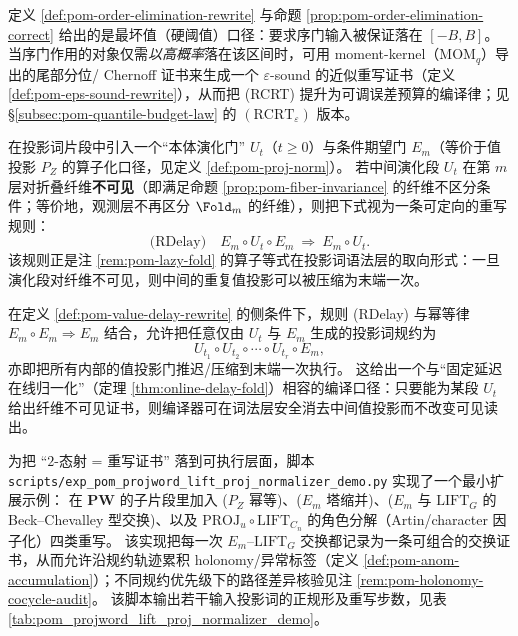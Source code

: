 \begin{remark}\label{rem:pom-rcrt-epsilon-pointer}
定义 \ref{def:pom-order-elimination-rewrite} 与命题 \ref{prop:pom-order-elimination-correct} 给出的是最坏值（硬阈值）口径：要求序门输入被保证落在 \([-B,B]\)。
当序门作用的对象仅需\emph{以高概率}落在该区间时，可用 moment-kernel（\(\mathrm{MOM}_q\)）导出的尾部分位/ Chernoff 证书来生成一个 \(\varepsilon\)-sound 的近似重写证书（定义 \ref{def:pom-eps-sound-rewrite}），从而把 (RCRT) 提升为可调误差预算的编译律；见 \S\ref{subsec:pom-quantile-budget-law} 的 \((\mathrm{RCRT}_\varepsilon)\) 版本。
\end{remark}

\begin{definition}\label{def:pom-value-delay-rewrite}
在投影词片段中引入一个“本体演化门” \(U_t\)（\(t\ge 0\)）与条件期望门 \(E_m\)（等价于值投影 \(P_Z\) 的算子化口径，见定义 \ref{def:pom-proj-norm}）。
若中间演化段 \(U_t\) 在第 \(m\) 层对折叠纤维\textbf{不可见}（即满足命题 \ref{prop:pom-fiber-invariance} 的纤维不区分条件；等价地，观测层不再区分 \(\Fold_m\) 的纤维），则把下式视为一条可定向的重写规则：
$$
\text{(RDelay)}\quad
E_m\circ U_t\circ E_m\ \Longrightarrow\ E_m\circ U_t.
$$
该规则正是注 \ref{rem:pom-lazy-fold} 的算子等式在投影词语法层的取向形式：一旦演化段对纤维不可见，则中间的重复值投影可以被压缩为末端一次。
\end{definition}

\begin{remark}\label{rem:pom-value-delay-normal-form}
在定义 \ref{def:pom-value-delay-rewrite} 的侧条件下，规则 (RDelay) 与幂等律 \(E_m\circ E_m\Rightarrow E_m\) 结合，允许把任意仅由 \(U_t\) 与 \(E_m\) 生成的投影词规约为
$$
U_{t_1}\circ U_{t_2}\circ\cdots\circ U_{t_r}\circ E_m,
$$
亦即把所有内部的值投影门推迟/压缩到末端一次执行。
这给出一个与“固定延迟在线归一化”（定理 \ref{thm:online-delay-fold}）相容的编译口径：只要能为某段 \(U_t\) 给出纤维不可见证书，则编译器可在词法层安全消去中间值投影而不改变可见读出。
\end{remark}

\begin{remark}\label{rem:pom-projword-lift-proj-normalizer-demo}
为把 “\(2\)-态射 = 重写证书” 落到可执行层面，脚本 \texttt{scripts/exp\_pom\_projword\_lift\_proj\_normalizer\_demo.py} 实现了一个最小扩展示例：
在 \(\mathbf{PW}\) 的子片段里加入
(\(P_Z\) 幂等)、(\(E_m\) 塔缩并)、(\(E_m\) 与 \(\mathrm{LIFT}_G\) 的 Beck--Chevalley 型交换)、以及 \(\mathrm{PROJ}_u\circ \mathrm{LIFT}_{C_n}\) 的角色分解（Artin/character 因子化）四类重写。
该实现把每一次 \(E_m\)--\(\mathrm{LIFT}_G\) 交换都记录为一条可组合的交换证书，从而允许沿规约轨迹累积 holonomy/异常标签（定义 \ref{def:pom-anom-accumulation}）；不同规约优先级下的路径差异核验见注 \ref{rem:pom-holonomy-cocycle-audit}。
该脚本输出若干输入投影词的正规形及重写步数，见表 \ref{tab:pom_projword_lift_proj_normalizer_demo}。

\end{remark}


